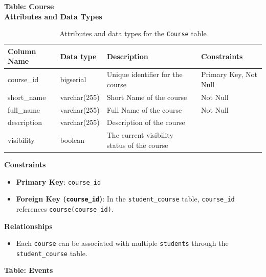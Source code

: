 \documentclass[12pt]{article}
\begin{document}
\pagebreak

\textbf{Table: Course} \\

\textbf{Attributes and Data Types}
\begin{table}[H]
    \centering
    \renewcommand{\arraystretch}{1.5}
    \begin{tabular}{|l|l|p{4.5cm}|l|}
    \hline
    \rowcolor[HTML]{96FFFB} 
    \textbf{Column Name} & \textbf{Data type} & \textbf{Description}                        & \textbf{Constraints}  \\ \hline
    course\_id           & bigserial          & Unique identifier for the course            & Primary Key, Not Null \\ \hline
    short\_name          & varchar(255)       & Short Name of the course                    & Not Null              \\ \hline
    full\_name           & varchar(255)       & Full Name of the course                     & Not Null              \\ \hline
    description          & varchar(255)       & Description of the course                   &                       \\ \hline
    visibility           & boolean            & The current visibility status of the course &                       \\ \hline
    \end{tabular}
    \caption{Attributes and data types for the \texttt{Course} table}
\end{table}

\noindent
\textbf{Constraints}
\begin{itemize}
    \item \textbf{Primary Key}: \texttt{course\_id}
    \item \textbf{Foreign Key (\texttt{course\_id})}: In the \texttt{student\_course} table, \texttt{course\_id} references \texttt{course(course\_id)}.
\end{itemize}

\noindent
\textbf{Relationships} 
\begin{itemize}
    \item Each \texttt{course} can be associated with multiple \texttt{students} through the \texttt{student\_course} table.
\end{itemize}

\pagebreak

\textbf{Table: Events} \\
\end{document}
